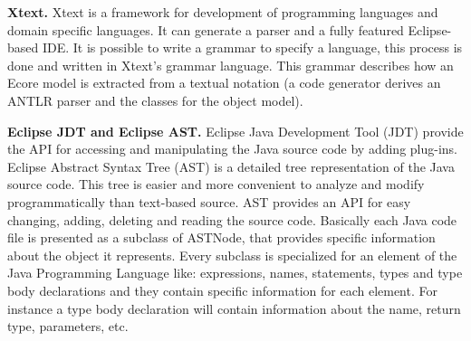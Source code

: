\textbf{Xtext.} Xtext \cite{xtext} is a framework for development of programming languages and domain specific languages. It can generate a parser and a fully featured Eclipse-based IDE. It is possible to write a grammar to specify a language, this process is done and written in Xtext's grammar language. This grammar describes how an Ecore model is extracted from a textual notation (a code generator derives an ANTLR parser and the classes for the object model).

\textbf{Eclipse JDT and Eclipse AST.} Eclipse Java Development Tool (JDT) \cite{jdt} provide the API for accessing and manipulating the Java source code by adding plug-ins. Eclipse Abstract Syntax Tree (AST) \cite{ast} is a detailed tree representation of the Java source code. This tree is easier and more convenient to analyze and modify programmatically than text-based source. AST provides an API for easy changing, adding, deleting and reading the source code. Basically each Java code file is presented as a subclass of ASTNode, that provides specific information about the object it represents. Every subclass is specialized for an element of the Java Programming Language like: expressions, names, statements, types and type body declarations and they contain specific information for each element. For instance a type body declaration will contain information about the name, return type, parameters, etc.

